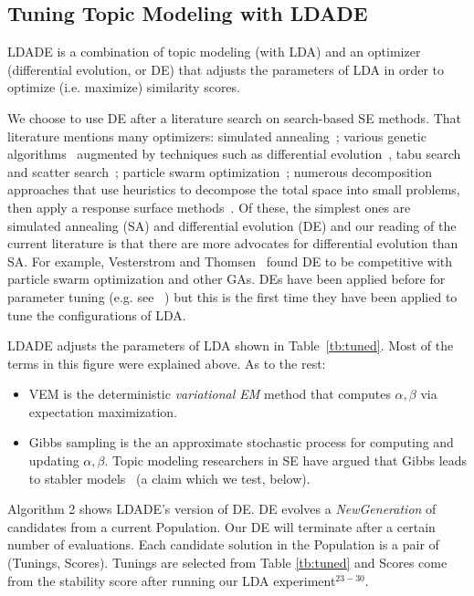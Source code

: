 \documentclass[10pt,conference]{IEEEtran}
\newcommand{\bi}{\begin{itemize}}
\newcommand{\ei}{\end{itemize}}
\theoremstyle{break}
\begin{document}
\subsection{Tuning Topic Modeling with LDADE}
\label{sect: tuning}
LDADE is a combination of topic modeling (with LDA) and an optimizer (differential evolution, or DE) that adjusts
the parameters of LDA in order to optimize (i.e. maximize) similarity scores.

We choose to use DE after a literature search on search-based SE methods.
That literature mentions many optimizers: simulated
annealing~\cite{feather2002converging, menzies2007business}; various genetic
algorithms~\cite{goldberg1979complexity} augmented by techniques such as
differential evolution~\cite{storn1997differential}, tabu search and scatter
search~\cite{glover1986general, beausoleil2006moss, molina2007sspmo,
  nebro2008abyss}; particle swarm optimization~\cite{pan2008particle}; numerous
decomposition approaches that use heuristics to decompose the total space into
small problems, then apply a response surface methods~\cite{krall2015gale,
  zuluaga2013active}. Of these, the simplest ones are simulated annealing (SA)
and differential evolution (DE) and  our reading of the current literature is
that there are more advocates for differential evolution than SA. For example,
Vesterstrom and Thomsen~\cite{vesterstrom2004comparative} found DE to be
competitive with particle swarm optimization and other GAs. DEs have been
applied before for parameter tuning (e.g. see~\cite{omran2005differential,
  chiha2012tuning, fu2016tuning} ) but this is the first time they have been
applied to tune the configurations of LDA.

LDADE  adjusts the parameters of   LDA  shown in
Table~\ref{tb:tuned}. Most of the terms in this figure were explained above. As to the rest:
\bi
\item VEM is the deterministic {\em variational EM} method that computes $\alpha,\beta$ via
  expectation maximization.
\item Gibbs sampling is the an approximate stochastic process for computing and updating $\alpha,\beta$.
  Topic modeling researchers in SE have argued that Gibbs leads to stabler models~\cite{lauman16a,layman2016topic} (a claim which we test, below).
  \ei

  

Algorithm 2 shows LDADE's version of DE.  DE evolves a \textit{NewGeneration} of
candidates from a current Population. Our DE will terminate after a certain
number of evaluations. Each candidate solution in the Population is a pair of
(Tunings, Scores). Tunings are selected from Table \ref{tb:tuned} and Scores
come from the stability score after running our LDA experiment$^{23-30}$.
\end{document}
